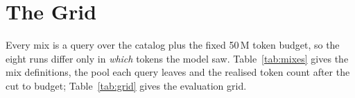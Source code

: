 \documentclass[10pt]{article}
\begin{document}
%
%


\newpage
\section{The Grid}

Every mix is a query over the catalog plus the fixed 50\,M token budget,
so the eight runs differ only in \emph{which} tokens the model saw.
Table~\ref{tab:mixes} gives the mix definitions, the pool each query
leaves and the realised token count after the cut to budget;
Table~\ref{tab:grid} gives the evaluation grid.
\end{document}
